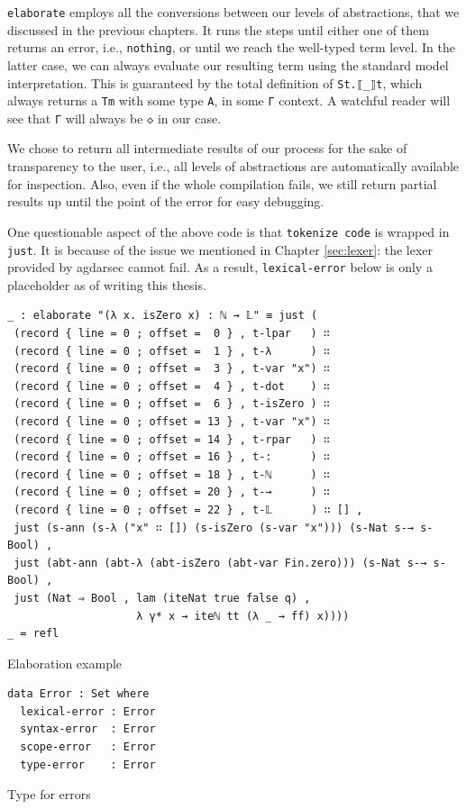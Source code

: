 \verb$elaborate$ employs all the conversions between our levels of abstractions, that we discussed in the previous chapters. It runs the steps until either one of them returns an error, i.e., \verb$nothing$, or until we reach the well-typed term level. In the latter case, we can always evaluate our resulting term using the standard model interpretation. This is guaranteed by the total definition of \verb$St.⟦_⟧t$, which always returns a \verb$Tm$ with some type \verb$A$, in some \verb$Γ$ context. A watchful reader will see that \verb$Γ$ will always be \verb$◇$ in our case.

We chose to return all intermediate results of our process for the sake of transparency to the user, i.e., all levels of abstractions are automatically available for inspection. Also, even if the whole compilation fails, we still return partial results up until the point of the error for easy debugging.

One questionable aspect of the above code is that \verb$tokenize code$ is wrapped in \verb$just$. It is because of the issue we mentioned in Chapter \ref{sec:lexer}: the lexer provided by agdarsec cannot fail. As a result, \verb$lexical-error$ below is only a placeholder as of writing this thesis.

\begin{listing}[H]
\begin{verbatim}
_ : elaborate "(λ x. isZero x) : ℕ → 𝕃" ≡ just (
 (record { line = 0 ; offset =  0 } , t-lpar   ) ∷
 (record { line = 0 ; offset =  1 } , t-λ      ) ∷
 (record { line = 0 ; offset =  3 } , t-var "x") ∷
 (record { line = 0 ; offset =  4 } , t-dot    ) ∷
 (record { line = 0 ; offset =  6 } , t-isZero ) ∷
 (record { line = 0 ; offset = 13 } , t-var "x") ∷
 (record { line = 0 ; offset = 14 } , t-rpar   ) ∷
 (record { line = 0 ; offset = 16 } , t-:      ) ∷
 (record { line = 0 ; offset = 18 } , t-ℕ      ) ∷
 (record { line = 0 ; offset = 20 } , t-→      ) ∷
 (record { line = 0 ; offset = 22 } , t-𝕃      ) ∷ [] ,
 just (s-ann (s-λ ("x" ∷ []) (s-isZero (s-var "x"))) (s-Nat s-→ s-Bool) ,
 just (abt-ann (abt-λ (abt-isZero (abt-var Fin.zero))) (s-Nat s-→ s-Bool) ,
 just (Nat ⇒ Bool , lam (iteNat true false q) ,
                    λ γ* x → iteℕ tt (λ _ → ff) x))))
_ = refl
\end{verbatim}
\caption{Elaboration example}
\label{code:elab-ex}
\end{listing}

\begin{listing}[H]
\begin{verbatim}
data Error : Set where
  lexical-error : Error
  syntax-error  : Error
  scope-error   : Error
  type-error    : Error
\end{verbatim}
\caption{Type for errors}
\label{code:elab-error}
\end{listing}

